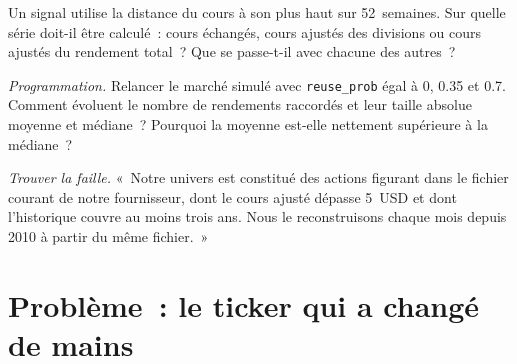 \begin{exercise}[$\star\star$]\label{exo:rs:universe-symbology-and-corporate-actions:6}
Un signal utilise la distance du cours à son plus haut sur 52~semaines. Sur quelle série doit-il être calculé~: cours échangés, cours ajustés des divisions ou
cours ajustés du rendement total~? Que se passe-t-il avec chacune des autres~?
\end{exercise}

\begin{exercise}[$\star\star\star$]\label{exo:rs:universe-symbology-and-corporate-actions:7}
\emph{Programmation.} Relancer le marché simulé avec \texttt{reuse\_prob} égal à 0, 0.35 et 0.7. Comment évoluent le nombre de rendements raccordés et
leur taille absolue moyenne et médiane~? Pourquoi la moyenne est-elle nettement supérieure à la médiane~?
\end{exercise}

\begin{exercise}[$\star\star\star$]\label{exo:rs:universe-symbology-and-corporate-actions:8}
\emph{Trouver la faille.} «~Notre univers est constitué des actions figurant dans le fichier courant de notre fournisseur, dont le cours ajusté dépasse 5~USD et dont l'historique
couvre au moins trois ans. Nous le reconstruisons chaque mois depuis 2010 à partir du même fichier.~»
\end{exercise}

\section{Problème~: le ticker qui a changé de mains}

